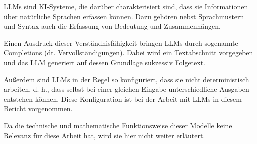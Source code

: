 \documentclass[../main.tex]{subfiles}
\begin{document}
\glspl{LLM} sind \gls{KI}-Systeme, die darüber charakterisiert sind, dass sie Informationen über natürliche Sprachen erfassen können.
Dazu gehören nebst Sprachmustern und Syntax auch die Erfassung von Bedeutung und Zusammenhängen.
\cite{zheng2023large}

Einen Ausdruck dieser Verständnisfähigkeit bringen \glspl{LLM} durch sogenannte Completions (dt. Vervollständigungen).
Dabei wird ein Textabschnitt vorgegeben und das \gls{LLM} generiert auf dessen Grundlage sukzessiv Folgetext.
\cite{naveed2023comprehensive}

Außerdem sind \glspl{LLM} in der Regel so konfiguriert, dass sie nicht deterministisch arbeiten, d. h., dass selbst bei einer gleichen Eingabe unterschiedliche Ausgaben entstehen können.
Diese Konfiguration ist bei der Arbeit mit \glspl{LLM} in diesem Bericht vorgenommen.

Da die technische und mathematische Funktionsweise dieser Modelle keine Relevanz für diese Arbeit hat, wird sie hier nicht weiter erläutert.
\end{document}
